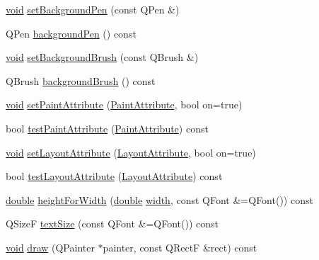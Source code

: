 \begin{DoxyCompactItemize}
\hyperlink{group___u_a_v_objects_plugin_ga444cf2ff3f0ecbe028adce838d373f5c}{void} \hyperlink{class_qwt_text_a6532e0c5cdcfc16cd007427f3ddf60fb}{set\-Background\-Pen} (const Q\-Pen \&)
\item 
Q\-Pen \hyperlink{class_qwt_text_af1aecfe1c9321dad4b80465f6d1a0649}{background\-Pen} () const 
\item 
\hyperlink{group___u_a_v_objects_plugin_ga444cf2ff3f0ecbe028adce838d373f5c}{void} \hyperlink{class_qwt_text_af016a747b234aede9f0cbbeb06ed2802}{set\-Background\-Brush} (const Q\-Brush \&)
\item 
Q\-Brush \hyperlink{class_qwt_text_a46bb4836482e4fe554f5079871343ba6}{background\-Brush} () const 
\item 
\hyperlink{group___u_a_v_objects_plugin_ga444cf2ff3f0ecbe028adce838d373f5c}{void} \hyperlink{class_qwt_text_aac80e3f05137173059b196206ceea9e8}{set\-Paint\-Attribute} (\hyperlink{class_qwt_text_a9739e47ea489e690f121e4b1d27ae24e}{Paint\-Attribute}, bool on=true)
\item 
bool \hyperlink{class_qwt_text_a53c4bcae538e272660d33bed6f71f01b}{test\-Paint\-Attribute} (\hyperlink{class_qwt_text_a9739e47ea489e690f121e4b1d27ae24e}{Paint\-Attribute}) const 
\item 
\hyperlink{group___u_a_v_objects_plugin_ga444cf2ff3f0ecbe028adce838d373f5c}{void} \hyperlink{class_qwt_text_a2b621d3104ead2185d2d939b1f5b9d68}{set\-Layout\-Attribute} (\hyperlink{class_qwt_text_a0953aabc098f410dba89bbada47f2e5a}{Layout\-Attribute}, bool on=true)
\item 
bool \hyperlink{class_qwt_text_a5b7bddee1d80139b93d60a0a3a044944}{test\-Layout\-Attribute} (\hyperlink{class_qwt_text_a0953aabc098f410dba89bbada47f2e5a}{Layout\-Attribute}) const 
\item 
\hyperlink{_super_l_u_support_8h_a8956b2b9f49bf918deed98379d159ca7}{double} \hyperlink{class_qwt_text_a29f7064fa8825d30e0b7b7b740d2df9f}{height\-For\-Width} (\hyperlink{_super_l_u_support_8h_a8956b2b9f49bf918deed98379d159ca7}{double} \hyperlink{glext_8h_a76aaa5c50746272e7d2de9aece921757}{width}, const Q\-Font \&=Q\-Font()) const 
\item 
Q\-Size\-F \hyperlink{class_qwt_text_a62537933249b2f967b54468360d41519}{text\-Size} (const Q\-Font \&=Q\-Font()) const 
\item 
\hyperlink{group___u_a_v_objects_plugin_ga444cf2ff3f0ecbe028adce838d373f5c}{void} \hyperlink{class_qwt_text_a01efd3ff82db2018b742265e0b7e4ece}{draw} (Q\-Painter $\ast$painter, const Q\-Rect\-F \&rect) const 
\end{DoxyCompactItemize}
